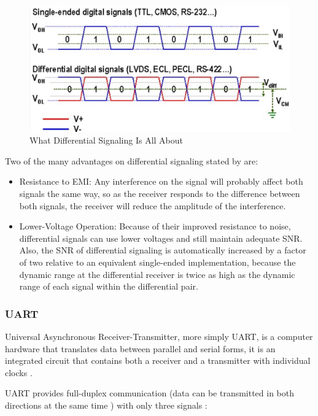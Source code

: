 		\begin{figure}[htbp]
			\centering
				\includegraphics[scale=0.8]{figuras/fig-diff-signaling}
			\caption{What Differential Signaling Is All About \cite{diff-signaling-autodesk}}
			\label{fig:diff-signaling}
		\end{figure}

	Two of the many advantages on differential signaling stated by \cite{pinkle2016dif} are:

	\begin{itemize}
		\item Resistance to EMI: Any interference on the signal will probably affect both signals the same way, so as the receiver responds to the difference between both signals, the receiver will reduce the amplitude of the interference.\label{itm:diff-signaling-emi}
		\item Lower-Voltage Operation: Because of their improved resistance to noise, differential signals can use lower voltages and still maintain adequate SNR. Also, the SNR of differential signaling is automatically increased by a factor of two relative to an equivalent single-ended implementation, because the dynamic range at the differential receiver is twice as high as the dynamic range of each signal within the differential pair.\label{itm:diff-signaling-low-voltage}
	\end{itemize}


\subsubsection{UART}\label{sssec:uart}
	Universal Asynchronous Receiver-Transmitter, more simply UART, is a computer hardware that translates data between parallel and serial forms, it is an integrated circuit that contains both a receiver and a transmitter with individual clocks \cite{futureUart}.
	\par
	UART provides full-duplex communication (data can be transmitted in both directions at the same time \cite{radunovic2011full}) with only three signals \cite{keimUart2016}:
	
